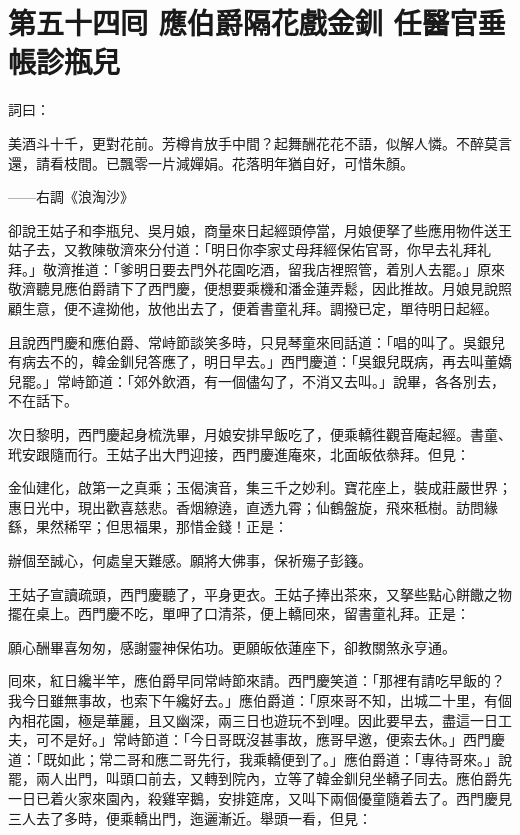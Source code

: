 
\chapter*{第五十四囘 應伯爵隔花戲金釧 任醫官垂帳診瓶兒}


詞曰：

美酒斗十千，更對花前。芳樽肯放手中間？起舞酬花花不語，似解人憐。不醉莫言還，請看枝間。已飄零一片減嬋娟。花落明年猶自好，可惜朱顏。

——右調《浪淘沙》

卻說王姑子和李瓶兒、吳月娘，商量來日起經頭停當，月娘便拏了些應用物件送王姑子去，又教陳敬濟來分付道：「明日你李家丈母拜經保佑官哥，你早去礼拜礼拜。」敬濟推道：「爹明日要去門外花園吃酒，留我店裡照管，着別人去罷。」原來敬濟聽見應伯爵請下了西門慶，便想要乘機和潘金蓮弄鬆，因此推故。月娘見說照顧生意，便不違拗他，放他出去了，便着書童礼拜。調撥已定，單待明日起經。

且說西門慶和應伯爵、常峙節談笑多時，只見琴童來囘話道：「唱的叫了。吳銀兒有病去不的，韓金釧兒答應了，明日早去。」西門慶道：「吳銀兒既病，再去叫董嬌兒罷。」常峙節道：「郊外飲酒，有一個儘勾了，不消又去叫。」說畢，各各別去，不在話下。

次日黎明，西門慶起身梳洗畢，月娘安排早飯吃了，便乘轎徃觀音庵起經。書童、玳安跟隨而行。王姑子出大門迎接，西門慶進庵來，北面皈依叅拜。但見：

金仙建化，啟第一之真乘；玉偈演音，集三千之妙利。寶花座上，裝成莊嚴世界；惠日光中，現出歡喜慈悲。香烟繚遶，直透九霄；仙鶴盤旋，飛來秪樹。訪問緣繇，果然稀罕；但思福果，那惜金錢！正是：

辦個至誠心，何處皇天難感。願將大佛事，保祈殤子彭籛。

王姑子宣讀疏頭，西門慶聽了，平身更衣。王姑子捧出茶來，又拏些點心餅饊之物擺在桌上。西門慶不吃，單呷了口清茶，便上轎囘來，留書童礼拜。正是：

願心酬畢喜匆匆，感謝靈神保佑功。更願皈依蓮座下，卻教關煞永亨通。

囘來，紅日纔半竿，應伯爵早同常峙節來請。西門慶笑道：「那裡有請吃早飯的？我今日雖無事故，也索下午纔好去。」應伯爵道：「原來哥不知，出城二十里，有個內相花園，極是華麗，且又幽深，兩三日也遊玩不到哩。因此要早去，盡這一日工夫，可不是好。」常峙節道：「今日哥既沒甚事故，應哥早邀，便索去休。」西門慶道：「既如此；常二哥和應二哥先行，我乘轎便到了。」應伯爵道：「專待哥來。」說罷，兩人出門，叫頭口前去，又轉到院內，立等了韓金釧兒坐轎子同去。應伯爵先一日已着火家來園內，殺雞宰鵝，安排筵席，又叫下兩個優童隨着去了。西門慶見三人去了多時，便乘轎出門，迤邐漸近。舉頭一看，但見：

